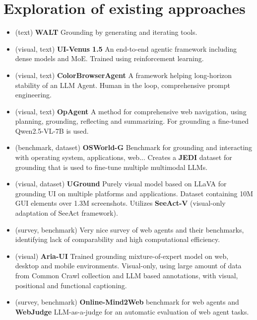 \newcommand{\cmark}{\ding{51}}
\newcommand{\xmark}{\ding{55}}


\chapter{Exploration of existing approaches}
\begin{itemize}
    \item \textcite{prabhu2025waltwebagentslearn} (text) \textbf{WALT} Grounding by generating and iterating tools.
    \item \textcite{venus15} (visual, text) \textbf{UI-Venus 1.5} An end-to-end agentic framework including dense models and MoE. Trained using reinforcement learning.
    \item \textcite{wang_colorbrowseragent_2026} (visual, text) \textbf{ColorBrowserAgent} A framework helping long-horizon stability of an LLM Agent. Human in the loop, comprehensive prompt engineering.
    \item \textcite{guo_opagent_2026} (visual, text) \textbf{OpAgent} A method for comprehensive web navigation, using planning, grounding, reflecting and summarizing. For grounding a fine-tuned Qwen2.5-VL-7B is used.
    \item \textcite{xie_scaling_2025} (benchmark, dataset) \textbf{OSWorld-G} Benchmark for grounding and interacting with operating system, applications, web... Creates a \textbf{JEDI} dataset for grounding that is used to fine-tune multiple multimodal LLMs.
    \item \textcite{gou_navigating_2025} (visual, dataset) \textbf{UGround} Purely visual model based on LLaVA for grounding UI on multiple platforms and applications. Dataset containing 10M GUI elements over 1.3M screenshots. Utilizes \textbf{SeeAct-V} (visual-only adaptation of SeeAct framework).
    \item \textcite{krupp_quantifying_2025} (survey, benchmark) Very nice survey of web agents and their benchmarks, identifying lack of comparability and high computational efficiency.
    \item \textcite{yang_aria-ui_2025} (visual) \textbf{Aria-UI} Trained grounding mixture-of-expert model on web, desktop and mobile environments. Visual-only, using large amount of data from Common Crawl collection and LLM based annotations, with visual, positional and functional captioning.
    \item \textcite{xue_illusion_2025} (survey, benchmark) \textbf{Online-Mind2Web} benchmark for web agents and \textbf{WebJudge} LLM-as-a-judge for an automatic evaluation of web agent tasks.

\end{itemize}
